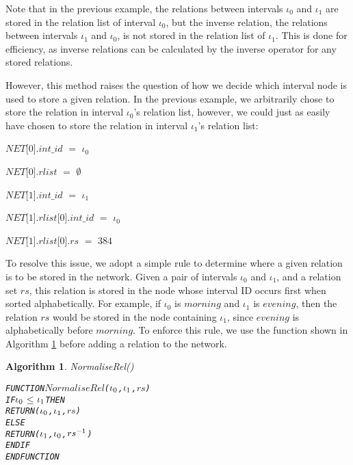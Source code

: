 \documentclass[11pt]{report}
\newenvironment{vverbatim}
{
  \begin{alltt}
}
{
    \vspace{-\baselineskip}
  \end{alltt}
}
\newtheorem{vvalgorithm}{Algorithm}[chapter]
\newenvironment{valgorithm}[2]
{
  \begin{vvalgorithm}{#1}
    \label{#2}
    \small
    \begin{vverbatim}
}
{
    \end{vverbatim}
  \end{vvalgorithm}
}
\newenvironment{vquote}
{
  \begin{list}{}{\leftmargin 1em}\item[]
}
{
  \end{list}
}
\begin{document}
          Note that in the previous example, the relations between intervals
          $\iota_0$ and $\iota_1$ are stored in the relation list of interval
          $\iota_0$, but the inverse relation, the relations between intervals
          $\iota_1$ and $\iota_0$, is not stored in the relation list of
          $\iota_1$. This is done for efficiency, as inverse relations can be
          calculated by the inverse operator for any stored relations.

          However, this method raises the question of how we decide which
          interval node is used to store a given relation. In the previous
          example, we arbitrarily chose to store the relation in interval
          $\iota_0$'s relation list, however, we could just as easily have
          chosen to store the relation in interval $\iota_1$'s relation list:

          \begin{vquote}
            $NET$[$0$].$int\_id$ $=$ $\iota_0$

            $NET$[$0$].$rlist$ $=$ $\emptyset$

            $NET$[$1$].$int\_id$ $=$ $\iota_1$

            $NET$[$1$].$rlist$[$0$].$int\_id$ $=$ $\iota_0$

            $NET$[$1$].$rlist$[$0$].$rs$ $=$ $384$
          \end{vquote}

          To resolve this issue, we adopt a simple rule to determine where a
          given relation is to be stored in the network. Given a pair of
          intervals $\iota_0$ and $\iota_1$, and a relation set $rs$, this
          relation is stored in the node whose interval ID occurs first when
          sorted alphabetically. For example, if $\iota_0$ is $morning$ and
          $\iota_1$ is $evening$, then the relation $rs$ would be stored
          in the node containing $\iota_1$, since $evening$ is alphabetically
          before $morning$. To enforce this rule, we use the function shown
          in Algorithm \ref{algo-impln-norml} before adding a relation to the
          network.

          \begin{valgorithm}{NormaliseRel()}{algo-impln-norml}
FUNCTION \(NormaliseRel\)(\(\iota\sb{0}\), \(\iota\sb{1}\), \(rs\))
  IF \(\iota\sb{0}\) \(\leq\) \(\iota\sb{1}\) THEN
    RETURN (\(\iota\sb{0}\), \(\iota\sb{1}\), \(rs\))
  ELSE
    RETURN (\(\iota\sb{1}\), \(\iota\sb{0}\), \(rs\sp{-1}\))
  ENDIF
ENDFUNCTION
          \end{valgorithm}
\end{document}

